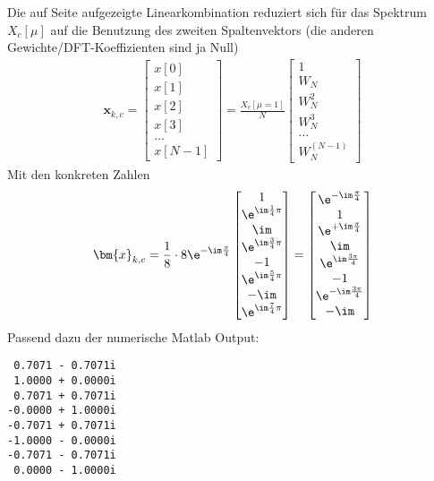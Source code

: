 \begin{ExCalc}
Die auf Seite \pageref{LinComb_for_IDFT} aufgezeigte Linearkombination reduziert
sich für das Spektrum $X_c[\mu]$ auf die Benutzung des zweiten Spaltenvektors (die
anderen Gewichte/DFT-Koeffizienten sind ja Null)
\begin{align*}
\bm{x}_{k,c}=
\begin{bmatrix}
x[0]\\[1em]
x[1]\\[1em]
x[2]\\[1em]
x[3]\\[1em]
\dots\\[1em]
x[N-1]
\end{bmatrix}
=
\frac{X_c[\mu=1]}{N}
\begin{bmatrix}
1\\[1em]
W_N\\[1em]
W_N^2\\[1em]
W_N^3\\[1em]
\dots\\[1em]
W_N^{(N-1)}
\end{bmatrix}
\end{align*}
Mit den konkreten Zahlen
\begin{align}
\bm{x}_{k,c} = \frac{1}{8} \cdot 8 \e^{-\im\frac{\pi}{4}}
\begin{bmatrix}
1 \\  \e^{\im\frac{1}{4}\pi} \\ \im \\ \e^{\im\frac{3}{4}\pi}  \\ -1 \\ \e^{\im\frac{5}{4}\pi} \\ -\im \\ \e^{\im\frac{7}{4}\pi}
\end{bmatrix}=
\begin{bmatrix}
\e^{-\im\frac{\pi}{4}}\\
1\\
\e^{+\im\frac{\pi}{4}}\\
\im\\
\e^{\im\frac{3\pi}{4}}\\
-1\\
\e^{-\im\frac{3\pi}{4}}\\
-\im
\end{bmatrix}
\end{align}
Passend dazu der numerische Matlab Output:
\begin{verbatim}
 0.7071 - 0.7071i
 1.0000 + 0.0000i
 0.7071 + 0.7071i
-0.0000 + 1.0000i
-0.7071 + 0.7071i
-1.0000 - 0.0000i
-0.7071 - 0.7071i
 0.0000 - 1.0000i
\end{verbatim}

\end{ExCalc}
